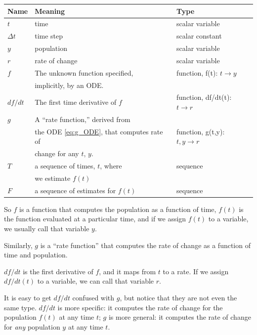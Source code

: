 \documentclass[
]{book}
\begin{document}
\begin{tabular}{|l|l|l|}
\hline
Name     &  Meaning             &  Type  \\
\hline \hline
$t$     &  time                 & scalar variable \\\hline
$\Delta t$  &  time step            & scalar constant \\\hline

$y$     &  population           & scalar variable \\\hline
$r$     &  rate of change       & scalar variable \\\hline

$f$     &  The unknown function specified,    &  function, f(t): $t \to y$  \\
        &  implicitly, by an ODE.             &    \\\hline

$df/dt$  &  The first time derivative of $f$  &  function, df/dt(t): $t \to r$  \\ \hline

$g$     &  A ``rate function,'' derived from     &  \\
        &  the ODE \eqref{eq:g_ODE}, that computes rate of &function, g(t,y): $t, y \to r$  \\
        &  change for any $t$, $y$.           &   \\\hline

$T$     & a sequence of times, $t$, where   & sequence \\
              & we estimate $f(t)$    &           \\\hline
$F$     & a sequence of estimates for $f(t)$  & sequence \\
\hline
\end{tabular}

So $f$ is a function that computes the population as a function of
time, $f(t)$ is the function evaluated at a particular time, and if we
assign $f(t)$ to a variable, we usually call that variable $y$.

Similarly, $g$ is a ``rate function'' that computes the rate of change as a
function of time and population.

$df/dt$ is the first derivative of $f$, and it maps from $t$ to a
rate.  If we assign $df/dt(t)$ to a variable,
we can call that variable $r$.

It is easy to get $df/dt$ confused with $g$, but notice that they are
not even the same type.
$df/dt$ is more specific: it computes the rate of change for the
population $f(t)$ at any time $t$;
$g$ is more general: it computes the rate
of change for \textit{any} population $y$ at any time $t$.
\end{document}

